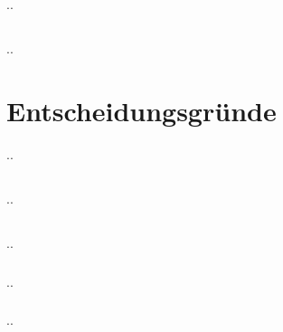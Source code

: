 \subsection{}

..

\subsection{}

..

\section*{Entscheidungsgründe}
..

\subsection{}

..

\subsection{}

..

\subsubsection{}
..

\subsubsection{}
..



